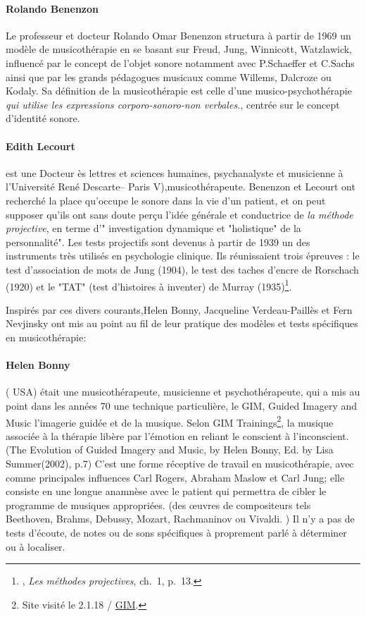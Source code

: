 	  \paragraph{Rolando Benenzon} Le professeur et docteur Rolando Omar Benenzon structura à partir de 1969 un modèle de musicothérapie en se basant sur Freud, Jung, Winnicott, Watzlawick, influencé par le concept de l'objet sonore notamment avec P.Schaeffer et C.Sachs ainsi que par les grands pédagogues musicaux comme Willems, Dalcroze ou Kodaly. Sa définition de la musicothérapie est celle d'une musico-psychothérapie  \emph{\textsl{qui utilise les expressions corporo-sonoro-non verbales.}}, centrée sur le concept d'identité sonore.

        \paragraph*{Edith Lecourt} est une Docteur ès lettres et sciences humaines, psychanalyste et musicienne à l'Université René Descarte-- Paris V),musicothérapeute.
        Benenzon et Lecourt ont  recherché la place qu'occupe le sonore dans la vie d'un patient, et on peut supposer qu'ils ont sans doute perçu l'idée générale et conductrice de \textsl{la méthode projective}, en terme 
	d'" investigation dynamique et "holistique" de la
        personnalité". Les tests projectifs sont devenus à partir
        de 1939 un des instruments très utilisés en psychologie
        clinique. Ils réunissaient trois épreuves : le test
        d'association de mots de Jung (1904), le test des taches
        d'encre de Rorschach (1920) et le "TAT" (test d'histoires à
        inventer) de Murray (1935)\footnote{\cite{ChabertAnzieu}, \emph{Les méthodes projectives}, ch.~1, p.~13.}.
		

	
Inspirés par ces divers courants,Helen Bonny, Jacqueline Verdeau-Paillès et Fern Nevjinsky ont  mis au point au fil de leur pratique des modèles et tests spécifiques en musicothérapie:


\paragraph{Helen Bonny } ( USA) était une musicothérapeute,
musicienne et psychothérapeute, qui a mis au point dans les années 70
une technique particulière, le GIM, \og Guided Imagery and Music\fg
l'imagerie guidée et de la musique. Selon GIM
Trainings\footnote{Site visité le 2.1.18 / \href{\#gimsite}{GIM}.}, la
musique associée à la thérapie libère par l'émotion en reliant le
conscient à l'inconscient.(The Evolution of Guided Imagery and Music, by Helen Bonny, Ed. by Lisa Summer(2002), p.7)
 C'est une forme réceptive de travail
en musicothérapie, avec comme principales influences Carl Rogers, Abraham Maslow et Carl Jung; elle  consiste en une longue anamnèse avec le
patient qui permettra de cibler le programme de musiques appropriées. 
(des \oe uvres de compositeurs tels Beethoven, Brahms, Debussy,
Mozart, Rachmaninov ou Vivaldi. )
Il n'y a  pas de
tests d'écoute, de notes ou de sons spécifiques à proprement parlé à déterminer ou à localiser.

